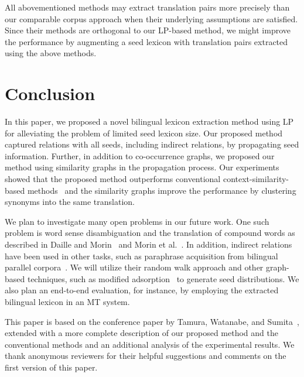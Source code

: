 \documentclass[english]{jnlp_1.4}
\begin{document}
All abovementioned methods may extract translation pairs more precisely than our comparable corpus approach when their underlying assumptions are satisfied. 
Since their methods are orthogonal to our LP-based method, we might improve the performance by augmenting a seed lexicon with translation pairs extracted using the above methods. 


\section{Conclusion}
\label{sect:conclusion}

In this paper, we proposed a novel bilingual lexicon extraction method using LP for alleviating the problem of limited seed lexicon size. 
Our proposed method captured relations with all seeds, including indirect relations, by propagating seed information. 
Further, in addition to co-occurrence graphs, we proposed our method using similarity graphs in the propagation process. 
Our experiments showed that the proposed method outperforms conventional context-similarity-based methods~\cite{rapp99,andrade10} and the similarity graphs improve the performance by clustering synonyms into the same translation. 

We plan to investigate many open problems in our future work. One such problem is word sense disambiguation and the translation of compound words as described in Daille and Morin~\citeyear{daille05} and Morin et al.~\citeyear{morin07}. 
In addition, indirect relations have been used in other tasks, such as paraphrase acquisition from bilingual parallel corpora~\cite{kok10}. 
We will utilize their random walk approach and other graph-based techniques, such as modified adsorption~\cite{pratim09} to generate seed distributions. 
We also plan an end-to-end evaluation, for instance, by employing the extracted bilingual lexicon in an MT system. 


\acknowledgment

This paper is based on the conference paper by Tamura, Watanabe, and Sumita~\citeyear{tamura12}, extended with a more complete description of our proposed method and the conventional methods and an additional analysis of the experimental results. 
We thank anonymous reviewers for their helpful suggestions and comments on the first version of this paper. 
\end{document}
